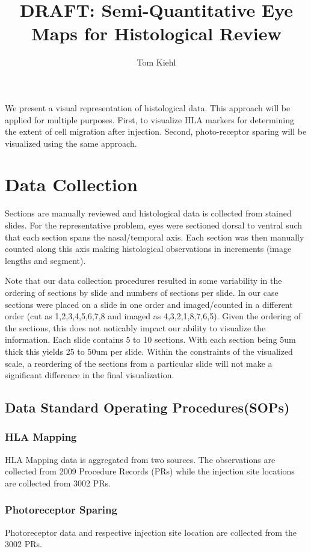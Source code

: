 \documentclass{article}
\title{DRAFT: Semi-Quantitative Eye Maps for Histological Review}
\author{Tom Kiehl}
\begin{document}

\maketitle{}



\abstract{}
We present a visual representation of histological data. This approach will be applied for multiple purposes. First, to visualize HLA markers for determining the extent of cell migration after injection. Second, photo-receptor sparing will be visualized using the same approach.


\section{Data Collection}
Sections are manually reviewed and histological data is collected from stained slides. For the representative problem, eyes were sectioned dorsal to ventral such that each section spans the nasal/temporal axis. Each section was then manually counted along this axis making histological observations in increments (image lengths and segment).

Note that our data collection procedures resulted in some variability in the ordering of sections by slide and numbers of sections per slide. In our case sections were placed on a slide in one order and imaged/counted in a different order (cut as 1,2,3,4,5,6,7,8 and imaged as 4,3,2,1,8,7,6,5). Given the ordering of the sections, this does not noticably impact our ability to visualize the information. Each slide contains 5 to 10 sections. With each section being 5um thick this yields 25 to 50um per slide. Within the constraints of the visualized scale, a reordering of the sections from a particular slide will not make a significant difference in the final visualization.

\subsection{Data Standard Operating Procedures(SOPs)}
\subsubsection{HLA Mapping}
HLA Mapping data is aggregated from two sources. The observations are collected from 2009 Procedure Records (PRs) while the injection site locations are collected from 3002 PRs.
\subsubsection{Photoreceptor Sparing}
Photoreceptor data and respective injection site location are collected from the 3002 PRs.
\end{document}
